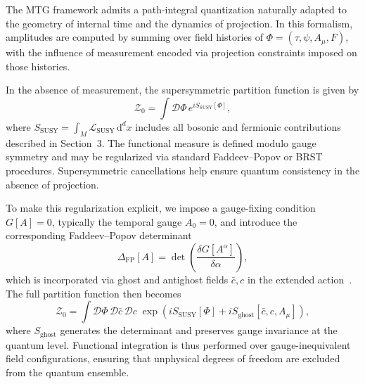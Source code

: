 \documentclass[11pt]{article}
\begin{document}
The MTG framework admits a path-integral quantization naturally adapted to the geometry of internal time and the dynamics of projection. In this formalism, amplitudes are computed by summing over field histories of \( \Phi = (\tau, \psi, A_\mu, F) \), with the influence of measurement encoded via projection constraints imposed on those histories.

In the absence of measurement, the supersymmetric partition function is given by
\begin{equation}
\mathcal{Z}_0 = \int \mathcal{D}\Phi \, e^{i S_{\mathrm{SUSY}}[\Phi]},
\end{equation}
where \( S_{\mathrm{SUSY}} = \int_M \mathcal{L}_{\mathrm{SUSY}} \, \mathrm{d}^d x \) includes all bosonic and fermionic contributions described in Section~3. The functional measure is defined modulo gauge symmetry and may be regularized via standard Faddeev--Popov or BRST procedures. Supersymmetric cancellations help ensure quantum consistency in the absence of projection.

To make this regularization explicit, we impose a gauge-fixing condition \( G[A] = 0 \), typically the temporal gauge \( A_0 = 0 \), and introduce the corresponding Faddeev--Popov determinant
\begin{equation}
\Delta_{\mathrm{FP}}[A] = \det \left( \frac{\delta G[A^\alpha]}{\delta \alpha} \right),
\end{equation}
which is incorporated via ghost and antighost fields \( \bar{c}, c \) in the extended action~\cite{faddeev1967feynman}. The full partition function then becomes
\begin{equation}
\mathcal{Z}_0 = \int \mathcal{D}\Phi \, \mathcal{D}\bar{c} \, \mathcal{D}c \; \exp\left( i S_{\mathrm{SUSY}}[\Phi] + i S_{\mathrm{ghost}}[\bar{c}, c, A_\mu] \right),
\end{equation}
where \( S_{\mathrm{ghost}} \) generates the determinant and preserves gauge invariance at the quantum level. Functional integration is thus performed over gauge-inequivalent field configurations, ensuring that unphysical degrees of freedom are excluded from the quantum ensemble.
\end{document}
